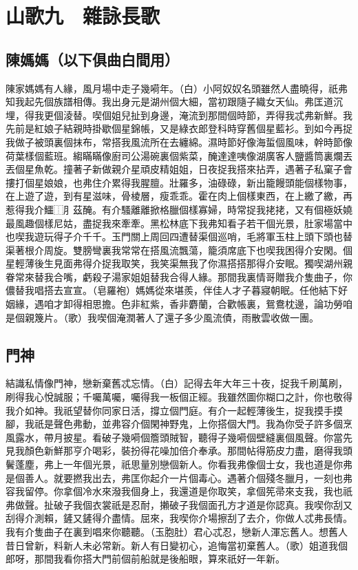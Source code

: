 \section*{山歌九　雜詠長歌}
\subsection*{陳媽媽（以下俱曲白間用）}

陳家媽媽有人緣，風月場中走子幾嗬年。（白）小阿奴奴名頭雖然人盡曉得，祇弗知我起先個族譜相傳。我出身元是湖州個大細，當初跟隨子織女天仙。弗匡道沉埋，得我更個淩替。喫個姐兒扯到身邊，淹流到那間個時節，弄得我忒弗新鮮。我先前是紅娘子結親時掛歇個星錦帳，又是綠衣郎登科時穿舊個星藍衫。到如今再捉我做子被頭裏個抹布，常搭我風流所在去纏綿。濕時節好像海蜇個風味，幹時節像荷葉樣個藍班。縐瞞瞞像廚司公湯碗裏個紫菜，醃達達咦像湖廣客人鹽醬筒裏爛丟丟個星魚乾。撞著子新做親介星頑皮精姐姐，日夜捉我搭來拈弄，遇著子私窠子會摟打個星娘娘，也弗住介累得我腥膻。壯羅多，油碌碌，新出籠饅頭能個樣物事，在上遊了遊，到有星滋味，骨棱層，瘦乖乖。霍在肉上個樣東西，在上繳了繳，再惹得我介鱷⿰⺼茲醃。有介騷離離掀格臘個樣寡婦，時常捉我㧯㧯，又有個極妖嬈最風趣個樣尼姑，盡捉我來牽牽。黑松林底下我弗知看子若干個光景，肚家場當中也喫我遊玩得子介千千。玉門關上周回四遭替渠個巡哨，毛將軍玉柱上頭下頭也替渠著根介周旋。雙膀彎裏我常常在搭風流飄蕩，籠須席底下也喫我困得介安閑。個星輕薄後生見面弗得介捉我取笑，我笑渠無我了你濕搭搭那得介安眠。獨喫湖州親眷常來替我合嘴，虧殺子湯家姐姐替我合得人緣。那間我裏情哥贈我介隻曲子，你儂替我唱搭去宣宣。（皂羅袍）媽媽從來堪羨，伴佳人才子暮寢朝眠。任他結下好姻緣，遇咱才卸得相思擔。色非紅紫，香非麝蘭，合歡帳裏，鴛鴦枕邊，論功勞咱是個親篾片。（歌）我喫個淹潤著人了還子多少風流債，雨散雲收做一團。

\subsection*{門神}

結識私情像門神，戀新棄舊忒忘情。（白）記得去年大年三十夜，捉我千刷萬刷，刷得我心悅誠服；千囑萬囑，囑得我一板個正經。我雖然圖你糊口之計，你也敬得我介如神。我祇望替你同家日活，撐立個門庭。有介一起輕薄後生，捉我摸手摸腳，我祇是聲色弗動，並弗容介個閑神野鬼，上你搭個大門。我為你受子許多個烹風露水，帶月披星。看破子幾嗬個簷頭賊智，聽得子幾嗬個壁縫裏個風聲。你當先見我顏色新鮮那亨介喝彩，裝扮得花噪加倍介奉承。那間帖得筋皮力盡，磨得我頭鬢蓬塵，弗上一年個光景，祇思量別戀個新人。你看我弗像個士女，我也道是你弗是個善人。就要撚我出去，弗匡你起介一片個毒心。遇著介個殘冬臘月，一刻也弗容我留停。你拿個冷水來潑我個身上，我還道是你取笑，拿個筅帚來支我，我也祇弗做聲。扯破子我個衣裳祇是忍耐，攋破子我個面孔方才道是你認真。我喫你刮又刮得介測賴，鏟又鏟得介盡情。屈來，我喫你介場擦刮了去介，你做人忒弗長情。我有介隻曲子在裏到唱來你聽聽。（玉胞肚）君心忒忍，戀新人渾忘舊人。想舊人昔日曾新，料新人未必常新。新人有日變初心，追悔當初棄舊人。（歌）姐道我個郎呀，那間我看你搭大門前個前船就是後船眼，算來祇好一年新。

